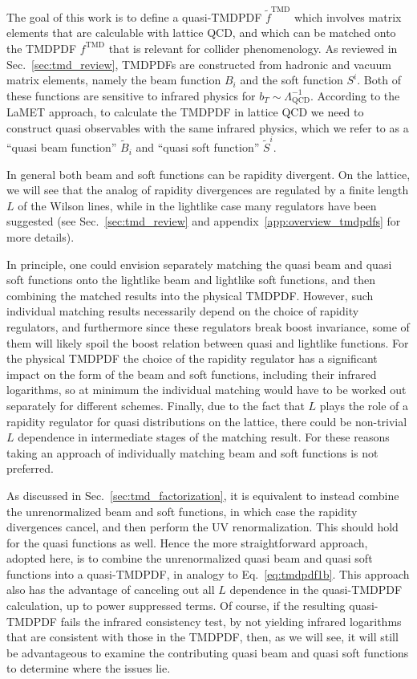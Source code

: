 \documentclass[11pt,a4paper]{article}
\DeclareRobustCommand{\eq}[1]{Eq.~\eqref{eq:#1}}
\DeclareRobustCommand{\app}[1]{appendix~\ref{app:#1}}
\DeclareRobustCommand{\sec}[1]{Sec.~\ref{sec:#1}}
\newcommand{\LQCD}{\Lambda_\mathrm{QCD}}
\newcommand\TMD{\mathrm{TMD}}
\begin{document}
The goal of this work is to define a quasi-TMDPDF $\tilde f^\TMD$ which involves matrix elements that are calculable with lattice QCD,
and which can be matched onto the TMDPDF $f^\TMD$ that is relevant for collider phenomenology.
As reviewed in \sec{tmd_review}, TMDPDFs are constructed from hadronic and vacuum matrix elements,
namely the beam function $B_i$ and the soft function $S^i$.  Both of these functions are sensitive to infrared physics for $b_T\sim \LQCD^{-1}$.
According to the LaMET approach, to calculate the TMDPDF in lattice QCD we need to construct quasi observables with the same infrared physics, which we refer to as a ``quasi beam function'' $\tilde B_i$ and ``quasi soft function'' $\tilde S^i$.

In general both beam and soft functions can be rapidity divergent.
On the lattice, we will see that the analog of rapidity divergences are regulated by a finite length $L$ of the Wilson lines, while in the lightlike case many regulators have been suggested (see \sec{tmd_review} and \app{overview_tmdpdfs} for more details).

In principle, one could envision separately matching the quasi beam and quasi soft functions onto the lightlike beam and lightlike soft functions, and then combining the matched results into the physical TMDPDF.
However, such individual matching results necessarily depend on the choice of rapidity regulators, and furthermore since these regulators break boost invariance, some of them will likely spoil the boost relation between quasi and lightlike functions. For the physical TMDPDF the choice of the rapidity regulator has a significant impact on the form of the beam and soft functions, 
including their infrared logarithms, so at minimum the individual matching would have to be worked out separately for different schemes.
Finally, due to the fact that $L$ plays the role of a rapidity regulator for quasi distributions on the lattice, there could be non-trivial $L$ dependence in intermediate stages of the matching result.
For these reasons taking an approach of individually matching beam and soft functions is not preferred.

As discussed in \sec{tmd_factorization}, it is equivalent to instead combine the unrenormalized beam and soft functions, in which case the rapidity divergences cancel, and then perform the UV renormalization.
This should hold for the quasi functions as well. Hence the more straightforward approach, adopted here, is to combine the unrenormalized quasi beam and quasi soft functions into a quasi-TMDPDF, in analogy to \eq{tmdpdf1b}.
This approach also has the advantage of canceling out all $L$ dependence in the quasi-TMDPDF calculation, up to power suppressed terms. Of course, if the resulting quasi-TMDPDF fails the infrared consistency test, by not yielding infrared logarithms that are consistent with those in the TMDPDF, then, as we will see, it will still be advantageous to examine the contributing quasi beam and quasi soft functions to determine where the issues lie.
\end{document}
